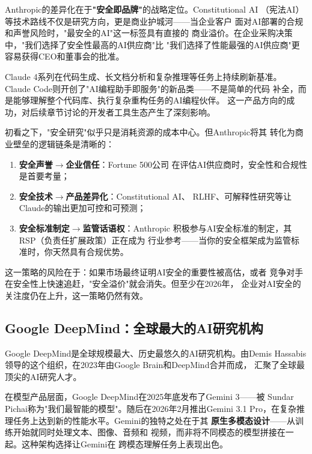 Anthropic的差异化在于\textbf{"安全即品牌"}的战略定位。Constitutional AI
（宪法AI）等技术路线不仅是研究方向，更是商业护城河——当企业客户
面对AI部署的合规和声誉风险时，"最安全的AI"这一标签具有直接的
商业溢价。在企业采购决策中，"我们选择了安全性最高的AI供应商"比
"我们选择了性能最强的AI供应商"更容易获得CEO和董事会的批准。

Claude 4系列在代码生成、长文档分析和复杂推理等任务上持续刷新基准。
Claude Code则开创了"AI编程助手即服务"的新品类——不是简单的代码
补全，而是能够理解整个代码库、执行复杂重构任务的AI编程伙伴。
这一产品方向的成功，对后续章节讨论的开发者工具生态产生了深刻影响。

\begin{whybox}[Anthropic的安全研究如何成为商业壁垒？]
初看之下，"安全研究"似乎只是消耗资源的成本中心。但Anthropic将其
转化为商业壁垒的逻辑链条是清晰的：
\begin{enumerate}
  \item \textbf{安全声誉}$\to$\textbf{企业信任}：Fortune 500公司
    在评估AI供应商时，安全性和合规性是首要考量；
  \item \textbf{安全技术}$\to$\textbf{产品差异化}：Constitutional AI、
    RLHF、可解释性研究等让Claude的输出更加可控和可预测；
  \item \textbf{安全标准制定}$\to$\textbf{监管话语权}：Anthropic
    积极参与AI安全标准的制定，其RSP（负责任扩展政策）正在成为
    行业参考——当你的安全框架成为监管标准时，你天然具有合规优势。
\end{enumerate}
这一策略的风险在于：如果市场最终证明AI安全的重要性被高估，或者
竞争对手在安全性上快速追赶，"安全溢价"就会消失。但至少在2026年，
企业对AI安全的关注度仍在上升，这一策略仍然有效。
\end{whybox}

\subsection{Google DeepMind：全球最大的AI研究机构}
\label{subsec:deepmind-recap}

Google DeepMind是全球规模最大、历史最悠久的AI研究机构。由Demis
Hassabis领导的这个组织，在2023年由Google Brain和DeepMind合并而成，
汇聚了全球最顶尖的AI研究人才。

在模型产品层面，Google DeepMind在2025年底发布了Gemini 3——被
Sundar Pichai称为"我们最智能的模型"。随后在2026年2月推出Gemini 3.1
Pro，在复杂推理任务上达到新的性能水平。Gemini的独特之处在于其
\textbf{原生多模态设计}——从训练开始就同时处理文本、图像、音频和
视频，而非将不同模态的模型拼接在一起。这种架构选择让Gemini在
跨模态理解任务上表现出色。


